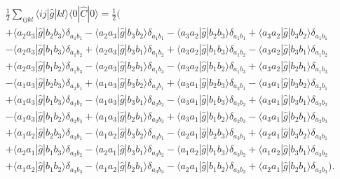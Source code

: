\documentclass[a4paper, 11pt, notitlepage, english]{article}
\newcommand{\op}[1]{\hat{#1}}
\newcommand{\braopket}[3]{\langle #1 | {#2} | #3 \rangle}
\begin{document}
\begin{align*}
&\frac{1}{2}\sum_{ijkl} \braopket{ij}{\op{g}}{kl}\braopket{0}{\op{C}}{0} = \frac{1}{2}\big( \\
&+ \braopket{a_2 a_3}{\op{g}}{b_2 b_3} \delta_{a_{1} b_{1}}
- \braopket{a_2 a_3}{\op{g}}{b_3 b_2} \delta_{a_{1} b_{1}}
- \braopket{a_3 a_2}{\op{g}}{b_2 b_3} \delta_{a_{1} b_{1}}
+ \braopket{a_3 a_2}{\op{g}}{b_3 b_2} \delta_{a_{1} b_{1}} \\
% 
&- \braopket{a_2 a_3}{\op{g}}{b_1 b_3} \delta_{a_{1} b_{2}}
+ \braopket{a_2 a_3}{\op{g}}{b_3 b_1} \delta_{a_{1} b_{2}}
+ \braopket{a_3 a_2}{\op{g}}{b_1 b_3} \delta_{a_{1} b_{2}}
- \braopket{a_3 a_2}{\op{g}}{b_3 b_1} \delta_{a_{1} b_{2}} \\
% 
&+ \braopket{a_2 a_3}{\op{g}}{b_1 b_2} \delta_{a_{1} b_{3}}
- \braopket{a_2 a_3}{\op{g}}{b_2 b_1} \delta_{a_{1} b_{3}}
- \braopket{a_3 a_2}{\op{g}}{b_1 b_2} \delta_{a_{1} b_{3}}
+ \braopket{a_3 a_2}{\op{g}}{b_2 b_1} \delta_{a_{1} b_{3}} \\
% 
&- \braopket{a_1 a_3}{\op{g}}{b_2 b_3} \delta_{a_{2} b_{1}}
+ \braopket{a_1 a_3}{\op{g}}{b_3 b_2} \delta_{a_{2} b_{1}}
+ \braopket{a_3 a_1}{\op{g}}{b_2 b_3} \delta_{a_{2} b_{1}}
- \braopket{a_3 a_1}{\op{g}}{b_3 b_2} \delta_{a_{2} b_{1}} \\
% 
&+ \braopket{a_1 a_3}{\op{g}}{b_1 b_3} \delta_{a_{2} b_{2}}
- \braopket{a_1 a_3}{\op{g}}{b_3 b_1} \delta_{a_{2} b_{2}}
- \braopket{a_3 a_1}{\op{g}}{b_1 b_3} \delta_{a_{2} b_{2}}
+ \braopket{a_3 a_1}{\op{g}}{b_3 b_1} \delta_{a_{2} b_{2}} \\
% 
&- \braopket{a_1 a_3}{\op{g}}{b_1 b_2} \delta_{a_{2} b_{3}}
+ \braopket{a_1 a_3}{\op{g}}{b_2 b_1} \delta_{a_{2} b_{3}}
+ \braopket{a_3 a_1}{\op{g}}{b_1 b_2} \delta_{a_{2} b_{3}}
- \braopket{a_3 a_1}{\op{g}}{b_2 b_1} \delta_{a_{2} b_{3}} \\
% 
&+ \braopket{a_1 a_2}{\op{g}}{b_2 b_3} \delta_{a_{3} b_{1}}
- \braopket{a_1 a_2}{\op{g}}{b_3 b_2} \delta_{a_{3} b_{1}}
- \braopket{a_2 a_1}{\op{g}}{b_2 b_3} \delta_{a_{3} b_{1}}
+ \braopket{a_2 a_1}{\op{g}}{b_3 b_2} \delta_{a_{3} b_{1}} \\
%
&+ \braopket{a_2 a_1}{\op{g}}{b_1 b_3} \delta_{a_{3} b_{2}}
- \braopket{a_2 a_1}{\op{g}}{b_3 b_1} \delta_{a_{3} b_{2}}
- \braopket{a_1 a_2}{\op{g}}{b_1 b_3} \delta_{a_{3} b_{2}}
+ \braopket{a_1 a_2}{\op{g}}{b_3 b_1} \delta_{a_{3} b_{2}} \\
%
&+ \braopket{a_1 a_2}{\op{g}}{b_1 b_2} \delta_{a_{3} b_{3}}
- \braopket{a_1 a_2}{\op{g}}{b_2 b_1} \delta_{a_{3} b_{3}}
- \braopket{a_2 a_1}{\op{g}}{b_1 b_2} \delta_{a_{3} b_{3}}
+ \braopket{a_2 a_1}{\op{g}}{b_2 b_1} \delta_{a_{3} b_{3}}\big).
\end{align*}
\end{document}
